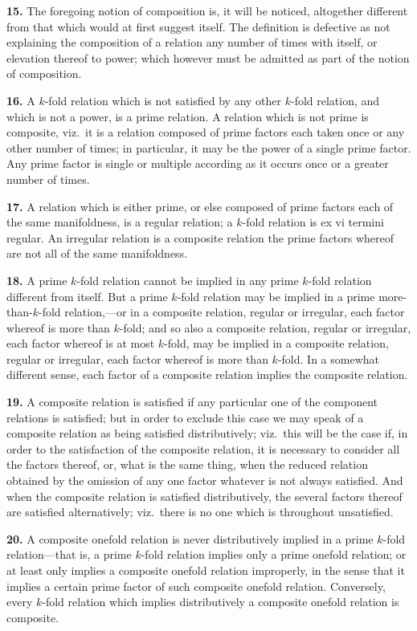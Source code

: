\documentclass[11pt,a4paper]{article}
\theoremstyle{definition}
\begin{document}
\noindent\textbf{15.} The foregoing notion of composition is, it will be noticed, altogether different from that which would at first suggest itself. The definition is defective as not explaining the composition of a relation any number of times with itself, or elevation thereof to power; which however must be admitted as part of the notion of composition.

\noindent\textbf{16.} A $k$-fold relation which is not satisfied by any other $k$-fold relation, and which is not a power, is a prime relation. A relation which is not prime is composite, viz.\ it is a relation composed of prime factors each taken once or any other number of times; in particular, it may be the power of a single prime factor. Any prime factor is single or multiple according as it occurs once or a greater number of times.

\noindent\textbf{17.} A relation which is either prime, or else composed of prime factors each of the same manifoldness, is a regular relation; a $k$-fold relation is ex vi termini regular. An irregular relation is a composite relation the prime factors whereof are not all of the same manifoldness.

\noindent\textbf{18.} A prime $k$-fold relation cannot be implied in any prime $k$-fold relation different from itself. But a prime $k$-fold relation may be implied in a prime more-than-$k$-fold relation,---or in a composite relation, regular or irregular, each factor whereof is more than $k$-fold; and so also a composite relation, regular or irregular, each factor whereof is at most $k$-fold, may be implied in a composite relation, regular or irregular, each factor whereof is more than $k$-fold. In a somewhat different sense, each factor of a composite relation implies the composite relation.

\noindent\textbf{19.} A composite relation is satisfied if any particular one of the component relations is satisfied; but in order to exclude this case we may speak of a composite relation as being satisfied distributively; viz.\ this will be the case if, in order to the satisfaction of the composite relation, it is necessary to consider all the factors thereof, or, what is the same thing, when the reduced relation obtained by the omission of any one factor whatever is not always satisfied. And when the composite relation is satisfied distributively, the several factors thereof are satisfied alternatively; viz.\ there is no one which is throughout unsatisfied.

\noindent\textbf{20.} A composite onefold relation is never distributively implied in a prime $k$-fold relation---that is, a prime $k$-fold relation implies only a prime onefold relation; or at least only implies a composite onefold relation improperly, in the sense that it implies a certain prime factor of such composite onefold relation. Conversely, every $k$-fold relation which implies distributively a composite onefold relation is composite.
\end{document}

